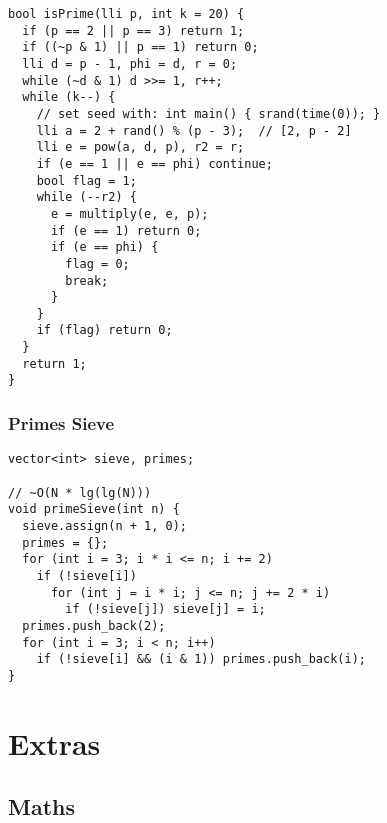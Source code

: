 \documentclass[twoside]{article}
\begin{document}
\begin{multicols*}{2}
\begin{verbatim}
bool isPrime(lli p, int k = 20) {
  if (p == 2 || p == 3) return 1;
  if ((~p & 1) || p == 1) return 0;
  lli d = p - 1, phi = d, r = 0;
  while (~d & 1) d >>= 1, r++;
  while (k--) {
    // set seed with: int main() { srand(time(0)); }
    lli a = 2 + rand() % (p - 3);  // [2, p - 2]
    lli e = pow(a, d, p), r2 = r;
    if (e == 1 || e == phi) continue;
    bool flag = 1;
    while (--r2) {
      e = multiply(e, e, p);
      if (e == 1) return 0;
      if (e == phi) {
        flag = 0;
        break;
      }
    }
    if (flag) return 0;
  }
  return 1;
}
\end{verbatim}

\subsubsectionfont{\large\bfseries\sffamily\underline}
\subsubsection*{Primes Sieve}
\begin{verbatim}
vector<int> sieve, primes;

// ~O(N * lg(lg(N)))
void primeSieve(int n) {
  sieve.assign(n + 1, 0);
  primes = {};
  for (int i = 3; i * i <= n; i += 2)
    if (!sieve[i])
      for (int j = i * i; j <= n; j += 2 * i)
        if (!sieve[j]) sieve[j] = i;
  primes.push_back(2);
  for (int i = 3; i < n; i++)
    if (!sieve[i] && (i & 1)) primes.push_back(i);
}
\end{verbatim}

\end{multicols*}
\sectionfont{\bfseries\sffamily\centering\Huge}
\vspace{1em}
\section*{Extras}
\vspace{3em}
\subsectionfont{\bfseries\sffamily\centering\LARGE}
\vspace{0em}
\subsection*{Maths}
\vspace{2em}
\subsubsectionfont{\large\bfseries\sffamily\underline}
\end{document}
